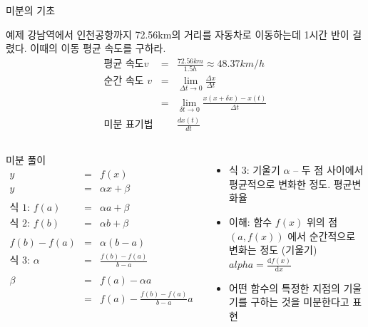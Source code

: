 \documentclass[10pt,t]{beamer}
\begin{document}
\begin{frame}{미분의 기초}
    \begin{block}{예제}
        강남역에서 인천공항까지 72.56km의 거리를 자동차로 이동하는데 1시간 반이 걸렸다. 이때의 이동 평균 속도를 구하라.
\begin{eqnarray*}
    \text{평균 속도} v &=& \frac{72.56km}{1.5h} \approx 48.37km/h \\
        \text{순간 속도 } v &=& \lim _{\Delta t \rightarrow 0} \frac{\Delta x}{ \Delta t}\\
        &=&\lim _{\delta t \rightarrow 0} \frac{x(x+\delta x)-x(t)}{ \Delta t}\\
        \text{미분 표기법} && \frac{dx(t)}{dt}
\end{eqnarray*}
    \end{block}

\pagebreak
\begin{columns}
     \vspace{-2em}
    \begin{block}{미분 풀이}
        \begin{eqnarray*}
        y &=& f(x)\\
        y &=& \alpha x + \beta\\
        \\
        \text{식 1: } f(a) &=& \alpha a + \beta \\
        \text{식 2: }f(b) &=& \alpha b + \beta \\ \\
        f(b) - f(a) &=& \alpha (b -a)\\
        \text{식 3: }\alpha &=& \frac{f(b)-f(a)}{b-a} \\ \\
        \beta &=& f(a) -\alpha a \\
        &=& f(a) - \frac{f(b)-f(a)}{b-a} a
        \end{eqnarray*}
        \end{block}

    \begin{itemize}
        \item 식 3: 기울기 $\alpha$ -- 두 점 사이에서 평균적으로 변화한 정도. 평균변화율
        \item 이해: 함수 $f(x)$ 위의 점 $(a, f(x))$ 에서 순간적으로 변화는 정도 (기울기)\\$alpha = \frac{\text{d}f(x)}{\text{d}x}$
        \item 어떤 함수의 특정한 지점의 기울기를 구하는 것을 미분한다고 표현
    \end{itemize}


\end{columns}
\end{frame}
\end{document}
